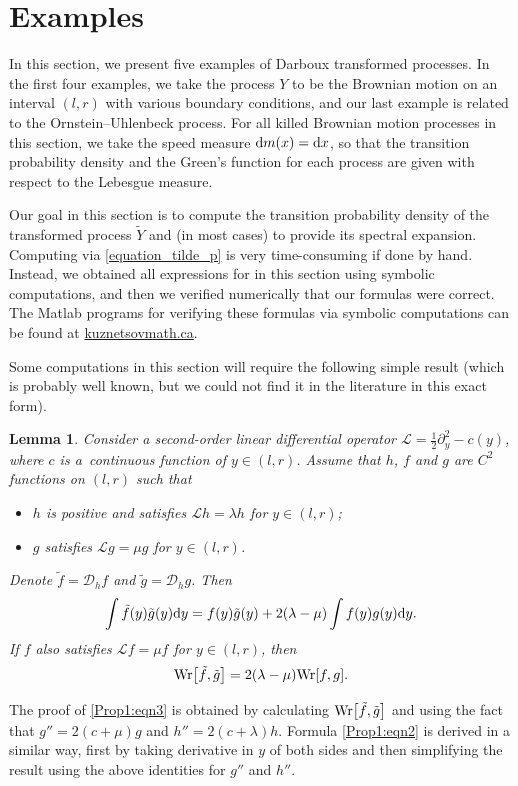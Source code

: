\documentclass[10pt,a4paper]{amsart}
\numberwithin{equation}{section}
\newtheorem{Lemma}[Theorem]{Lemma}
\theoremstyle{definition}
\def\L{{\mathcal L}}
\def\wr{{\textnormal{Wr}}}
\def\d{{\textnormal d}}
\begin{document}
\section{Examples}\label{section_Examples}

In this section, we present five examples of Darboux transformed processes. In the first four examples, we take the process $Y$ to be the Brownian motion on an interval $(l,r)$ with various boundary conditions, and our last example is related to the Ornstein--Uhlenbeck process. For all killed Brownian motion processes in this section, we take the speed measure $\d m(x)=\d x$, so that the transition probability density and the Green's function for each process are given with respect to the Lebesgue measure.

Our goal in this section is to compute the transition probability density of the transformed process $\widetilde Y$ and (in most cases) to provide its spectral expansion. Computing  via \eqref{equation_tilde_p}
is very time-consuming if done by hand. Instead, we obtained all expressions for  in this section using symbolic computations, and then we verified numerically that our formulas were correct. The {\sc Matlab} programs for verifying these formulas via symbolic computations can be found at \href{https://kuznetsovmath.ca/}{kuznetsovmath.ca}.

Some computations in this section will require the following simple result (which is probably well known, but we could not find it in the literature in this exact form).
\begin{Lemma}\label{lemma_Dh}
Consider a second-order linear differential operator $\L=\frac{1}{2} \partial_y^2-c(y)$, where $c$ is a~continuous function of $y\in (l,r)$. Assume that $h$, $f$ and $g$ are $C^2$ functions on $(l,r)$ such that
\begin{itemize}\itemsep=0pt
\item[$(i)$] $h$ is positive and satisfies $\L h=\lambda h$ for $y\in (l,r)$;
\item[$(ii)$] $g$ satisfies $\L g=\mu g$ for $y\in (l,r)$.
\end{itemize}
Denote $\tilde f={\mathcal D}_h f$ and $\tilde g=\mathcal D_h g$. Then
\begin{equation}\label{Prop1:eqn2}
\int \tilde f(y) \tilde g(y) \d y=f(y) \tilde g(y) +2(\lambda-\mu) \int f(y) g(y) \d y.
\end{equation}
If $f$ also satisfies $\L f=\mu f$ for $y\in (l,r)$, then
 \begin{equation}\label{Prop1:eqn3}
\wr\big[\tilde f, \tilde g\big]= 2 (\lambda - \mu) \wr[f,g].
\end{equation}
\end{Lemma}
The proof of \eqref{Prop1:eqn3} is obtained by calculating $\wr\big[\tilde f, \tilde g\big]$ and using the fact that $g''=2(c+\mu) g$ and $h''=2(c+\lambda) h$. Formula \eqref{Prop1:eqn2} is derived in a similar way, first by taking derivative in $y$ of both sides and then simplifying the result using the above identities for $g''$ and $h''$.
\end{document}
